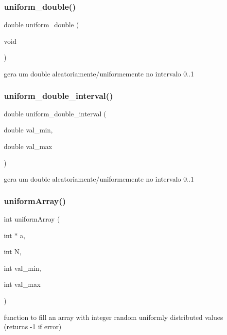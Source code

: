 \subsubsection{uniform\+\_\+double()}
{\footnotesize\ttfamily double uniform\+\_\+double (\begin{DoxyParamCaption}\item[{void}]{ }\end{DoxyParamCaption})}



gera um double aleatoriamente/uniformemente no intervalo 0..1 

\label{lib__util_8h_a7ba1451d0da2635a229e7a38c8cb855f} 
\subsubsection{uniform\+\_\+double\+\_\+interval()}
{\footnotesize\ttfamily double uniform\+\_\+double\+\_\+interval (\begin{DoxyParamCaption}\item[{double}]{val\+\_\+min,  }\item[{double}]{val\+\_\+max }\end{DoxyParamCaption})}



gera um double aleatoriamente/uniformemente no intervalo 0..1 

\label{lib__util_8h_a9b94966f5987d3980e36efcd8398f95f} 
\subsubsection{uniform\+Array()}
{\footnotesize\ttfamily int uniform\+Array (\begin{DoxyParamCaption}\item[{int $\ast$}]{a,  }\item[{int}]{N,  }\item[{int}]{val\+\_\+min,  }\item[{int}]{val\+\_\+max }\end{DoxyParamCaption})}



function to fill an array with integer random uniformly distributed values (returns -\/1 if error) 

